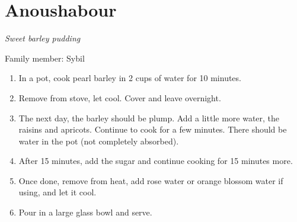 \chapter{Anoushabour}
\label{ch:anoushabour}



\textit{Sweet barley pudding}

Family member: Sybil

\begin{enumerate}
    \item In a pot, cook pearl barley in 2 cups of water for 10 minutes.
    \item Remove from stove, let cool. Cover and leave overnight.
    \item The next day, the barley should be plump. Add a little more water, the raisins and apricots. Continue to cook for a few minutes. There should be water in the pot (not completely absorbed).
    \item After 15 minutes, add the sugar and continue cooking for 15 minutes more.
    \item Once done, remove from heat, add rose water or orange blossom water if using, and let it cool.
    \item Pour in a large glass bowl and serve.
\end{enumerate}
